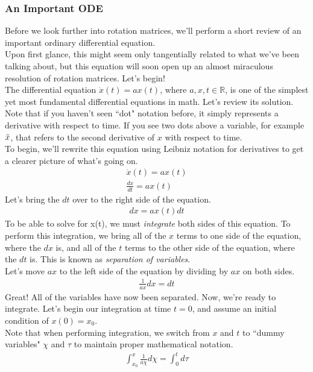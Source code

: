 \documentclass[oneside]{book}
\begin{document}
\subsubsection{An Important ODE}
Before we look further into rotation matrices, we'll perform a short review of an important ordinary differential equation. \\
Upon first glance, this might seem only tangentially related to what we've been talking about, but this equation will soon open up an almost miraculous resolution of rotation matrices. Let's begin!\\
The differential equation $\dot{x}(t) = ax(t)$, where $a, x, t \in \mathbb{R}$, is one of the simplest yet most fundamental differential equations in math. Let's review its solution.\\
Note that if you haven't seen ``dot" notation before, it simply represents a derivative with respect to time. If you see two dots above a variable, for example $\Ddot{x}$, that refers to the second derivative of $x$ with respect to time.\\
To begin, we'll rewrite this equation using Leibniz notation for derivatives to get a clearer picture of what's going on.
\begin{align}
    \dot{x}(t) = ax(t)\\
    \frac{dx}{dt} = ax(t)
\end{align}
Let's bring the $dt$ over to the right side of the equation.
\begin{align}
    dx = ax(t)dt
\end{align}
To be able to solve for x(t), we must \textit{integrate} both sides of this equation. To perform this integration, we bring all of the $x$ terms to one side of the equation, where the $dx$ is, and all of the $t$ terms to the other side of the equation, where the $dt$ is. This is known as \textit{separation of variables}.\\
Let's move $ax$ to the left side of the equation by dividing by $ax$ on both sides.
\begin{align}
    \frac{1}{ax}dx = dt
\end{align}
Great! All of the variables have now been separated. Now, we're ready to integrate. Let's begin our integration at time $t = 0$, and assume an initial condition of $x(0) = x_0$.\\
Note that when performing integration, we switch from $x$ and $t$ to ``dummy variables" $\chi$ and $\tau$ to maintain proper mathematical notation.
\begin{align}
    \int_{x_0}^{x} \frac{1}{a\chi}d\chi = \int_0^td\tau
\end{align}
\end{document}
